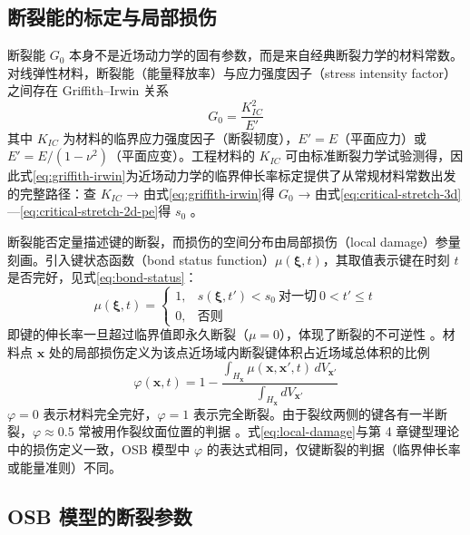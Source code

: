 \subsection{断裂能的标定与局部损伤}\label{sec:fracture-energy}

断裂能 $G_{0}$ 本身不是近场动力学的固有参数，而是来自经典断裂力学的材料常数。对线弹性材料，断裂能（能量释放率）与应力强度因子（stress intensity factor）之间存在 Griffith–Irwin 关系
\begin{equation}
  G_{0}=\frac{K_{IC}^{2}}{E'}
  \label{eq:griffith-irwin}
\end{equation}
其中 $K_{IC}$ 为材料的临界应力强度因子（断裂韧度），$E'=E$（平面应力）或 $E'=E/(1-\nu^{2})$（平面应变）\cite{Griffith1921,Irwin1957}。工程材料的 $K_{IC}$ 可由标准断裂力学试验测得，因此式\eqref{eq:griffith-irwin}为近场动力学的临界伸长率标定提供了从常规材料常数出发的完整路径：查 $K_{IC}$ → 由式\eqref{eq:griffith-irwin}得 $G_{0}$ → 由式\eqref{eq:critical-stretch-3d}—\eqref{eq:critical-stretch-2d-pe}得 $s_{0}$ \cite{OterkusOterkus2026}。

断裂能否定量描述键的断裂，而损伤的空间分布由局部损伤（local damage）参量刻画。引入键状态函数（bond status function）$\mu(\boldsymbol{\xi},t)$，其取值表示键在时刻 $t$ 是否完好，见式\eqref{eq:bond-status}：
\begin{equation}
  \mu(\boldsymbol{\xi},t)=
  \begin{cases}
    1, & s(\boldsymbol{\xi},t')<s_{0}\ \text{对一切}\ 0<t'\le t\\
    0, & \text{否则}
  \end{cases}
  \label{eq:bond-status}
\end{equation}
即键的伸长率一旦超过临界值即永久断裂（$\mu=0$），体现了断裂的不可逆性 \cite{SillingAskari2005}。材料点 $\mathbf{x}$ 处的局部损伤定义为该点近场域内断裂键体积占近场域总体积的比例
\begin{equation}
  \varphi(\mathbf{x},t)=1-\frac{\int_{H_{\mathbf{x}}}\mu(\mathbf{x},\mathbf{x}',t)\,dV_{\mathbf{x}'}}
  {\int_{H_{\mathbf{x}}}dV_{\mathbf{x}'}}
  \label{eq:local-damage}
\end{equation}
$\varphi=0$ 表示材料完全完好，$\varphi=1$ 表示完全断裂。由于裂纹两侧的键各有一半断裂，$\varphi\approx 0.5$ 常被用作裂纹面位置的判据 \cite{SillingAskari2005,MadenciOterkus2014}。式\eqref{eq:local-damage}与第 4 章键型理论中的损伤定义一致，OSB 模型中 $\varphi$ 的表达式相同，仅键断裂的判据（临界伸长率或能量准则）不同。

\subsection{OSB 模型的断裂参数}\label{sec:osb-fracture-params}

